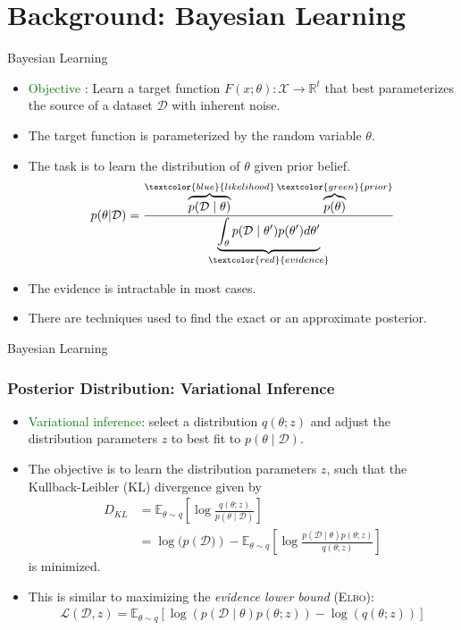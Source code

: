 \section{Background: Bayesian Learning}


\begin{frame}[c]{Bayesian Learning}
  \begin{itemize}
  \item \textcolor{green}{Objective} : Learn a target function $F(x; \theta) :
  \mathcal{X} \rightarrow \mathbb{R}^t$ that best parameterizes the source of a
  dataset $\mathcal{D}$ with inherent noise.
  \item The target function is parameterized by the random variable $\theta$.
  \item The task is to learn the distribution of $\theta$ given prior belief.
  \begin{equation*}
    p(\theta | \mathcal{D}) = \frac{ \overbrace{p(\mathcal{D} \mid \theta)}^{\textcolor{blue}{likelihood}} \overbrace{p(\theta)}^{\textcolor{green}{prior}}}{\underbrace{\int_\theta p(\mathcal{D} \mid \theta') p(\theta') d\theta'}_{\textcolor{red}{evidence}}}
  \end{equation*}
    \item The evidence is intractable in most cases.
    \item There are techniques used to find the exact or an approximate posterior.
  \end{itemize}
\end{frame}

\begin{frame}{Bayesian Learning}
  \frametitle{Posterior Distribution: Variational Inference}
  \begin{itemize}
    \item \textcolor{green}{Variational inference}: select a distribution $q(\theta;z)$
    and adjust the distribution parameters $z$ to best fit to $p(\theta \mid \mathcal{D})$.
    \item The objective is to learn the distribution parameters $z$, such that
    the Kullback-Leibler (KL) divergence given by
    \begin{align*}
      D_{KL} &= \mathbb{E}_{\theta \sim q}\left [ \log \frac{q(\theta;z)}{p(\theta \mid \mathcal{D})} \right] \\
      &= \log(p({\mathcal{D})}) - \mathbb{E}_{\theta \sim q} \left[ \log \frac{ p(\mathcal{D} \mid \theta)p(\theta;z)}{q(\theta;z)}\right]
    \end{align*}
    is minimized.
    \item This is similar to maximizing the \textit{evidence lower bound} (\textsc{Elbo}):
    \begin{align*}
        \mathcal{L}(\mathcal{D},z) = \mathbb{E}_{\theta \sim q} \left[\log( p(\mathcal{D} \mid \theta)p(\theta;z)) - \log(q(\theta;z)) \right]
    \end{align*}
  \end{itemize}
\end{frame}

